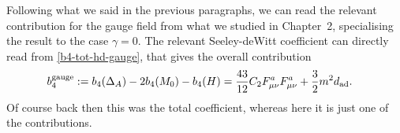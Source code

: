 Following what we said in the previous paragraphs, we can read the relevant contribution for the gauge field from what we studied in Chapter~2, specialising the result to the case $\gamma = 0$. The relevant Seeley-deWitt coefficient can directly read from \eqref{b4-tot-hd-gauge}, that gives the overall contribution
\begin{equation}
\begin{split}
b_4^{ \text{gauge} } 
& := b_4(\Delta_A) - 2 b_4(M_0) - b_4(H)
 = \frac{43}{12} C_2 F_{\mu\nu}^a F_{\mu\nu}^a + \frac{3}{2} m^2 d_{ \text{ad} }.
\end{split}
\end{equation}
Of course back then this was the total coefficient, whereas here it is just one of the contributions.









